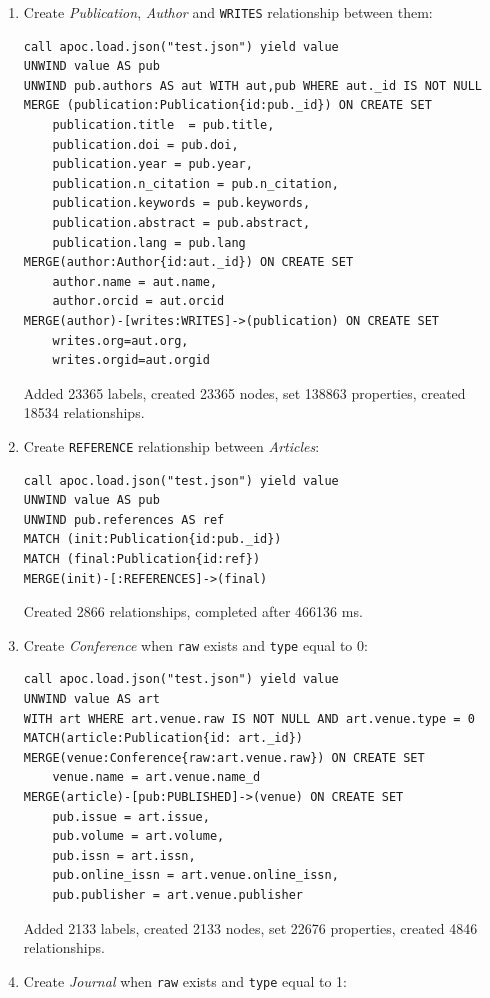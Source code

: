 \documentclass{Configuration_Files/PoliMi3i_thesis}
\begin{document}
\begin{enumerate}
    \item Create \emph{Publication}, \emph{Author} and \verb |WRITES| relationship between them:
        \begin{lstlisting}[language=cypher, label=lst:cypher-example]
call apoc.load.json("test.json") yield value
UNWIND value AS pub
UNWIND pub.authors AS aut WITH aut,pub WHERE aut._id IS NOT NULL
MERGE (publication:Publication{id:pub._id}) ON CREATE SET
    publication.title  = pub.title,
    publication.doi = pub.doi,
    publication.year = pub.year,
    publication.n_citation = pub.n_citation,
    publication.keywords = pub.keywords,
    publication.abstract = pub.abstract,
    publication.lang = pub.lang
MERGE(author:Author{id:aut._id}) ON CREATE SET
    author.name = aut.name,
    author.orcid = aut.orcid
MERGE(author)-[writes:WRITES]->(publication) ON CREATE SET
    writes.org=aut.org,
    writes.orgid=aut.orgid
        \end{lstlisting}
        Added 23365 labels, created 23365 nodes, set 138863 properties, created 18534 relationships.
    \item Create \verb |REFERENCE| relationship between \emph{Articles}:
        \begin{lstlisting}[language=cypher, label=lst:cypher-example]
call apoc.load.json("test.json") yield value
UNWIND value AS pub
UNWIND pub.references AS ref
MATCH (init:Publication{id:pub._id})
MATCH (final:Publication{id:ref})
MERGE(init)-[:REFERENCES]->(final)
        \end{lstlisting}
        Created 2866 relationships, completed after 466136 ms.
    \item Create \emph{Conference} when \verb |raw| exists and \verb |type| equal to 0:
        \begin{lstlisting}[language=cypher, label=lst:cypher-example]
call apoc.load.json("test.json") yield value
UNWIND value AS art
WITH art WHERE art.venue.raw IS NOT NULL AND art.venue.type = 0
MATCH(article:Publication{id: art._id})
MERGE(venue:Conference{raw:art.venue.raw}) ON CREATE SET
    venue.name = art.venue.name_d
MERGE(article)-[pub:PUBLISHED]->(venue) ON CREATE SET
    pub.issue = art.issue,
    pub.volume = art.volume,
    pub.issn = art.issn,
    pub.online_issn = art.venue.online_issn,
    pub.publisher = art.venue.publisher
        \end{lstlisting}
        Added 2133 labels, created 2133 nodes, set 22676 properties, created 4846 relationships.
    \item Create \emph{Journal} when \verb |raw| exists and \verb |type| equal to 1:

\end{enumerate}
\end{document}
